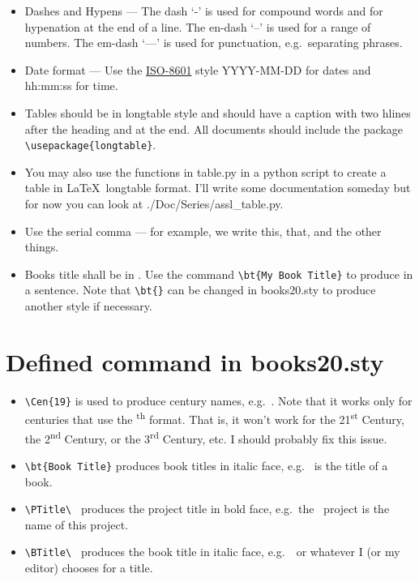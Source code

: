 \documentclass{article}
\begin{document}
\begin{itemize}

\item Dashes and Hypens --- The dash `-' is used for compound words and for
  hypenation at the end of a line.  The en-dash `--' is used for a range
  of numbers. The em-dash `---' is used for punctuation,
  e.g.\ separating phrases.

\item Date format --- Use the
  \href{https://en.wikipedia.org/wiki/ISO\_8601}{ISO-8601} style
  YYYY-MM-DD for dates and hh:mm:ss for time.

\item Tables should be in longtable style and should have a caption with two
  hlines after the heading and at the end.  All documents should include
  the package \verb|\usepackage{longtable}|.

\item You may also use the functions in table.py in a python script to create
  a table in \LaTeX\ longtable format.  I'll write some documentation someday
  but for now you can look at ./Doc/Series/assl\_table.py.

\item Use the serial comma --- for example, we write this, that, and the
  other things.

\item Books title shall be in . Use the command
  \verb|\bt{My Book Title}| to produce  in a
  sentence. Note that \verb|\bt{}| can be changed in books20.sty
  to produce another style if necessary.

\end{itemize}


\section{Defined command in books20.sty}

\begin{itemize}

\item \verb|\Cen{19}| is used to produce century names,
  e.g.\ . Note that it works only for centuries that use the
  \textsuperscript{th} format.  That is, it won't work for the
  21\textsuperscript{st} Century, the 2\textsuperscript{nd} Century,
  or the 3\textsuperscript{rd} Century, etc. I should probably fix
  this issue.

\item \verb|\bt{Book Title}| produces book titles in italic face,
e.g.\  is the title of a book.

\item \verb|\PTitle\ | produces the project title in bold face,
  e.g.\ the \PTitle\ project is the name of this project.

\item \verb|\BTitle\ | produces the book title in italic face,
  e.g.\ \BTitle\ or whatever I (or my editor) chooses for a title.

\end{itemize}
\end{document}
